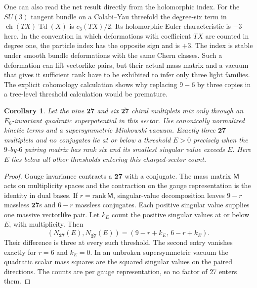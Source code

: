 \documentclass[aps,prd,reprint,onecolumn,nofootinbib,amsmath,amssymb]{revtex4-2}
\newtheorem{corollary}[proposition]{Corollary}
\begin{document}
One can also read the net result directly from the holomorphic index. For the $SU(3)$ tangent bundle on a Calabi--Yau threefold the degree-six term in $\operatorname{ch}(TX)\operatorname{Td}(X)$ is $c_3(TX)/2$. Its holomorphic Euler characteristic is $-3$ here. In the convention in which deformations with coefficient $TX$ are counted in degree one, the particle index has the opposite sign and is $+3$. The index is stable under smooth bundle deformations with the same Chern classes. Such a deformation can lift vectorlike pairs, but their actual mass matrix and a vacuum that gives it sufficient rank have to be exhibited to infer only three light families. The explicit cohomology calculation shows why replacing $9-6$ by three copies in a tree-level threshold calculation would be premature.

\begin{corollary}\label{cor:pairthreshold}
Let the nine $\mathbf{27}$ and six $\overline{\mathbf{27}}$ chiral multiplets mix only through an $E_6$-invariant quadratic superpotential in this sector. Use canonically normalized kinetic terms and a supersymmetric Minkowski vacuum. Exactly three $\mathbf{27}$ multiplets and no conjugates lie at or below a threshold $E>0$ precisely when the $9$-by-$6$ pairing matrix has rank six and its smallest singular value exceeds $E$. Here $E$ lies below all other thresholds entering this charged-sector count.
\end{corollary}
\begin{proof}
Gauge invariance contracts a $\mathbf{27}$ with a conjugate. The mass matrix $\mathsf M$ acts on multiplicity spaces and the contraction on the gauge representation is the identity in dual bases. If $r=\mathrm{rank}\,\mathsf M$, singular-value decomposition leaves $9-r$ massless $\mathbf{27}$s and $6-r$ massless conjugates. Each positive singular value supplies one massive vectorlike pair. Let $k_E$ count the positive singular values at or below $E$, with multiplicity. Then
\begin{equation}
 (N_{\mathbf{27}}(E),N_{\overline{\mathbf{27}}}(E))
       =(9-r+k_E,\,6-r+k_E).
\end{equation}
Their difference is three at every such threshold. The second entry vanishes exactly for $r=6$ and $k_E=0$. In an unbroken supersymmetric vacuum the quadratic scalar mass squares are the squared singular values on the paired directions. The counts are per gauge representation, so no factor of 27 enters them.
\end{proof}
\end{document}
